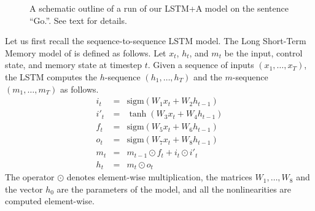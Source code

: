 \documentclass{article} \usepackage{nips15submit_e,times}
\newcommand\citet\cite
\begin{document}
\begin{figure}
\begin{center}
\end{center}
\caption{\small A schematic outline of a run of our LSTM+A model on
the sentence ``Go.''. See text for details.}
\label{fig:model}
\end{figure}

Let us first recall the sequence-to-sequence LSTM model.
The Long Short-Term Memory model of \citet{hochreiter1997}
is defined as follows.  Let $x_t$, $h_t$, and $m_t$ be the input, control
state, and memory state at timestep $t$.
Given a sequence of inputs $(x_1,\ldots,x_T)$, the LSTM computes
the $h$-sequence $(h_1,\ldots,h_T)$ and
the $m$-sequence $(m_1,\ldots,m_T)$ as follows.
\begin{eqnarray*}
i_t &=& \mathrm{sigm}(W_1 x_t + W_2 h_{t-1}) \\
i'_t &=& \tanh(W_3 x_t + W_4 h_{t-1}) \\
f_t &=& \mathrm{sigm}(W_5 x_t + W_6 h_{t-1}) \\
o_t &=& \mathrm{sigm}(W_7 x_t + W_8 h_{t-1}) \\
m_t &=& m_{t-1}\odot f_t + i_t \odot i'_t \\
h_t &=& m_t\odot o_t
\end{eqnarray*}
The operator $\odot$ denotes element-wise multiplication,
the matrices $W_1,\ldots,W_8$ and the vector $h_0$ are the parameters
of the model, and all the nonlinearities are computed element-wise.
\end{document}
